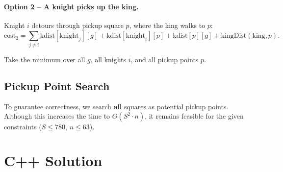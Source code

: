 \documentclass[11pt,a4paper]{article}
\begin{document}
\paragraph{Option 2 -- A knight picks up the king.}
Knight $i$ detours through pickup square $p$, where the king walks to $p$:
\[
  \mathrm{cost}_2 = \sum_{j \ne i} \mathrm{kdist}[\mathrm{knight}_j][g]
    + \mathrm{kdist}[\mathrm{knight}_i][p] + \mathrm{kdist}[p][g]
    + \mathrm{kingDist}(\mathrm{king}, p).
\]

Take the minimum over all $g$, all knights $i$, and all pickup points $p$.

\subsection{Pickup Point Search}

To guarantee correctness, we search \textbf{all} squares as potential pickup points.
Although this increases the time to $O(S^2 \cdot n)$, it remains feasible for the
given constraints ($S \le 780$, $n \le 63$).

\section{C++ Solution}
\end{document}
